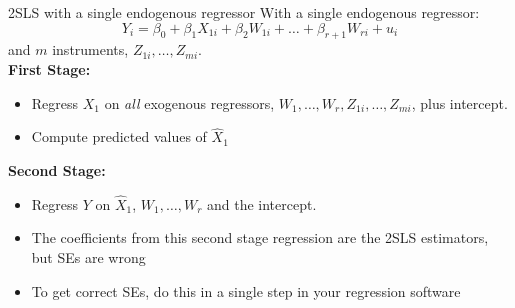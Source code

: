 \documentclass[notes,10pt, aspectratio=169]{beamer}
\begin{document}
\begin{frame}{2SLS with a single endogenous regressor}
With a single endogenous regressor:
\begin{equation*}
    Y_i = \beta_0 + \beta_1 X_{1i} + \beta_2 W_{1i} + \dots + \beta_{r+1} W_{ri} + u_i
\end{equation*}
and $m$ instruments, $Z_{1i}, \dots,Z_{mi}$.\\[1em]

\textbf{First Stage:}\\
\begin{itemize}
    \item Regress $X_{1}$ on \textit{all} exogenous regressors, $W_{1}, \dots, W_{r}, Z_{1i}, \dots,Z_{mi}$, plus intercept.
    \item Compute predicted values of $\hat{X}_1$
\end{itemize}
\vspace{1em}
\textbf{Second Stage:}\\
\begin{itemize}
    \item Regress $Y$ on $\hat{X}_1$, $W_{1}, \dots, W_{r}$ and the intercept.
    \item The coefficients from this second stage regression are the 2SLS estimators, but SEs are wrong
    \item To get correct SEs, do this in a single step in your regression software
\end{itemize}
\end{frame}
\end{document}
